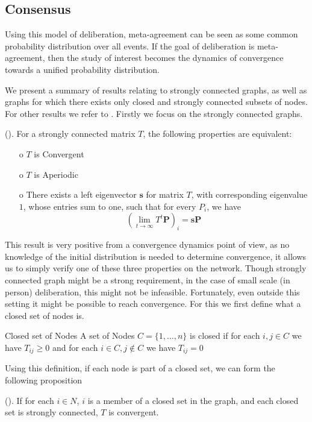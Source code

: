 \subsection{Consensus}
\label{sub: concensus DeGroot}
Using this model of deliberation, meta-agreement can be seen as some common probability distribution over all events. If the goal of deliberation is meta-agreement, then the study of interest becomes the dynamics of convergence towards a unified probability distribution.

We present a summary of results relating to strongly connected graphs, as well as graphs for which there exists only closed and strongly connected subsets of nodes. For other results we refer to \citet{golubNaiveLearningSocial2010}. Firstly we focus on the strongly connected graphs.

\begin{proposition}{(\citet{golubNaiveLearningSocial2010}).}
	For a strongly connected matrix \(T\), the following properties are equivalent:
	\begin{itemize}
		\item[o] \(T\) is Convergent
		\item[o] \(T\) is Aperiodic
		\item[o] There exists a left eigenvector \(\boldsymbol{s}\) for matrix \(T\), with corresponding eigenvalue \(1\), whose entries sum to one, such that for every $P_i$, we have
			\[\left(\lim_{t\to \infty}T^{t} \boldsymbol{P}\right)_{i} = \boldsymbol{s}\boldsymbol{P}\]
	\end{itemize}
\end{proposition}

This result is very positive from a convergence dynamics point of view, as no knowledge of the initial distribution is needed to determine convergence, it allows us to simply verify one of these three properties on the network. Though strongly connected graph might be a strong requirement, in the case of small scale (in person) deliberation, this might not be infeasible. Fortunately, even outside this setting it might be possible to reach convergence. For this we first define what a closed set of nodes is.

\begin{definition}{Closed set of Nodes}{}
	A set of Nodes \(C = \{1, \dots, n\}\) is closed if for each \(i,j \in C\) we have $T_{ij} \geq 0$ and for each \(i \in C, j \notin C\) we have \(T_{ij} = 0\)
\end{definition}

Using this definition, if each node is part of a closed set, we can form the following proposition

\begin{proposition}{(\citet{golubNaiveLearningSocial2010}).}
	If for each \(i \in N\), \(i\) is a member of a closed set in the graph, and each closed set is strongly connected, \(T\) is convergent.
\end{proposition}








